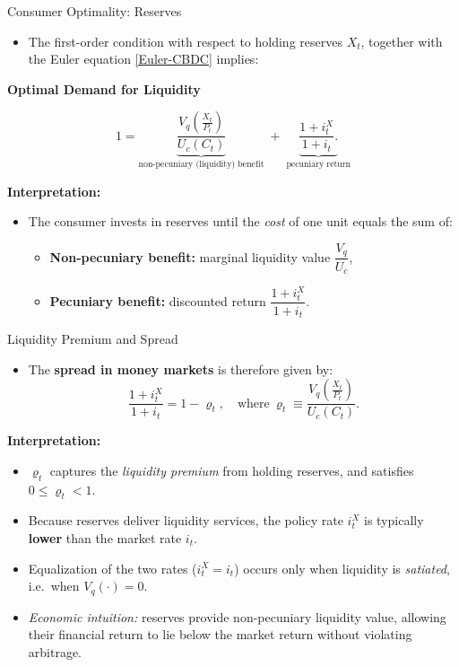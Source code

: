 \documentclass[11pt,aspectratio=169]{beamer}
\begin{document}
\begin{frame}[label=liquidity]{Consumer Optimality: Reserves}
\small

\begin{itemize}
    \item  The first-order condition with respect to holding reserves $X_t$, together with the Euler equation \eqref{Euler-CBDC} implies:
\end{itemize}

\textbf{Optimal Demand for Liquidity}

\[
1=
\underbrace{
\frac{V_q\!\left(\frac{X_t}{P_t}\right)}{U_c(C_t)}
}_{\text{non-pecuniary (liquidity) benefit}}
\;+\;
\underbrace{
\frac{1+i_t^{X}}{1+i_t}
.}_{\text{pecuniary return}}
\]

\textbf{Interpretation:}
\begin{itemize}
  \item The consumer invests in reserves until the \emph{cost} of one unit equals the sum of:
    \begin{itemize}
      \item \textbf{Non-pecuniary benefit:} marginal liquidity value 
            $\dfrac{V_q}{U_c}$,
      \item \textbf{Pecuniary benefit:} discounted return 
            $\dfrac{1+i_t^{X}}{1+i_t}$.
    \end{itemize}
 \end{itemize}


\begin{center}
\hyperlink{liq_proof}{}
\end{center}

\end{frame}


\begin{frame}{Liquidity Premium and Spread}
\small
\begin{itemize}
    \item The \textbf{spread in money markets} is therefore given by:
\begin{equation}
\frac{1+i_t^{X}}{1+i_t} = 1 - \varrho_t, \quad \text{where} \ \varrho_t \equiv 
\frac{V_q\!\left(\frac{X_t}{P_t}\right)}{U_c(C_t)}.
\label{eq:Spread_CBDC}
\end{equation}
\end{itemize}
\textbf{Interpretation:}
\begin{itemize}
  \item $\varrho_t$ captures the \emph{liquidity premium} from holding reserves,
        and satisfies $0 \le \varrho_t < 1$.
  \item Because reserves deliver liquidity services, the policy rate $i_t^{X}$ is typically \textbf{lower} than the market rate $i_t$.
  \item Equalization of the two rates ($i_t^{X}=i_t$) occurs only when liquidity is \emph{satiated}, i.e.\ when $V_q(\cdot)=0$.
  \item \textit{Economic intuition:} reserves provide non-pecuniary liquidity value, allowing their financial return to lie below the market return without violating arbitrage.
\end{itemize}

\end{frame}
\end{document}
